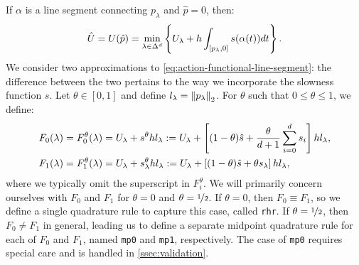 \documentclass[sisc-eikonal.tex]{subfiles}
\begin{document}
If $\alpha$ is a line segment connecting $p_\lambda$ and
$\hat{p} = 0$, then:
\begin{equation}
  \label{eq:action-functional-line-segment}
  \hat{U} = U(\hat{p}) = \min_{\lambda \in \Delta^d} \set{U_\lambda + h \int_{[p_\lambda, 0]} s(\alpha(t))dt}.
\end{equation}
We consider two approximations to \cref{eq:action-functional-line-segment}: the
difference between the two pertains to the way we incorporate the
slowness function $s$. Let $\theta \in [0, 1]$ and define
$l_\lambda = \left\|p_\lambda\right\|_2$. For $\theta$ such that
$0 \leq \theta \leq 1$, we define:
\begin{align}
  F_0(\lambda) = F_0^\theta(\lambda) &= U_\lambda + s^{\theta} h l_\lambda := U_\lambda + \squareb{(1-\theta)\hat{s} + \frac{\theta}{d + 1} \sum_{i=0}^d s_i} h l_\lambda, \label{eq:f0-definition} \\
  F_1(\lambda) = F_1^\theta(\lambda) &= U_\lambda + s^{\theta}_\lambda h l_\lambda := U_\lambda + \squareb{(1-\theta)\hat{s} + \theta s_\lambda} h l_\lambda,
\end{align}
where we typically omit the superscript in $F_i^\theta$. We will
primarily concern ourselves with $F_0$ and $F_1$ for $\theta = 0$ and
$\theta = \nicefrac{1}{2}$. If $\theta = 0$, then $F_0 \equiv F_1$, so
we define a single quadrature rule to capture this case, called
\texttt{rhr}. If $\theta = \nicefrac{1}{2}$, then $F_0 \neq F_1$ in
general, leading us to define a separate midpoint quadrature rule for
each of $F_0$ and $F_1$, named \texttt{mp0} and \texttt{mp1},
respectively. The case of \texttt{mp0} requires special care and is
handled in \cref{ssec:validation}.
\end{document}
